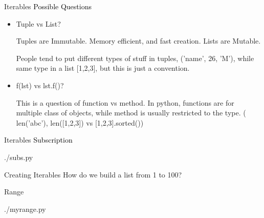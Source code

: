 \documentclass{beamer}
\begin{document}
\begin{frame}{Iterables}
  \textcolor{black}{\large{Possible Questions}}
  \begin{itemize}
    \item Tuple vs List?

      Tuples are Immutable. Memory efficient, and fast creation.
      Lists are Mutable.

      People tend to put different types of stuff in tuples,
      ('name', 26, 'M'), while same type in a list [1,2,3], 
      but this is just a convention.
    \item f(lst) vs lst.f()?

      This is a question of function vs method. In python, functions are for
      multiple class of objects, while method is usually restricted to the
      type. ( len('abc'), len([1,2,3]) vs [1,2,3].sorted())
  \end{itemize}
\end{frame}

\begin{frame}{Iterables}
  \textcolor{black}{\large{Subscription}}
  \begin{lstinputlisting}
    {./subs.py}
  \end{lstinputlisting}
\end{frame}

\begin{frame}{Creating Iterables}
  How do we build a list from 1 to 100?
\end{frame}

\begin{frame}{Range}
  \begin{lstinputlisting}
    {./myrange.py}
  \end{lstinputlisting}

\end{frame}
\end{document}
